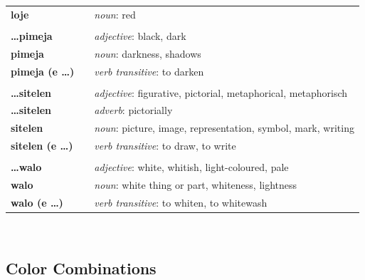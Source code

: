 \begin{supertabular}{p{2,5cm}|ll}
    \textbf{loje}              &  & \textit{noun}: red                                                    \\ %
                               &  &                                                                       \\ %
    \textbf{\dots pimeja}      &  & \textit{adjective}: black, dark                                       \\ %
    \textbf{pimeja}            &  & \textit{noun}: darkness, shadows                                      \\ %
    \textbf{pimeja (e \dots)}  &  & \textit{verb transitive}: to darken                                   \\ %
                               &  &                                                                       \\ %
    \textbf{\dots sitelen}     &  & \textit{adjective}: figurative, pictorial, metaphorical, metaphorisch \\ %
    \textbf{\dots sitelen}     &  & \textit{adverb}: pictorially                                          \\ %
    \textbf{sitelen}           &  & \textit{noun}: picture, image, representation, symbol, mark, writing  \\ %
    \textbf{sitelen (e \dots)} &  & \textit{verb transitive}: to draw, to write                           \\ %
                               &  &                                                                       \\ %
    \textbf{\dots walo}        &  & \textit{adjective}: white, whitish, light-coloured, pale              \\ %
    \textbf{walo}              &  & \textit{noun}: white thing or part, whiteness, lightness              \\ %
    \textbf{walo (e \dots)}    &  & \textit{verb transitive}: to whiten, to whitewash                     \\ %
\end{supertabular} \\
%
%
\newpage
%
\subsection*{Color Combinations}
